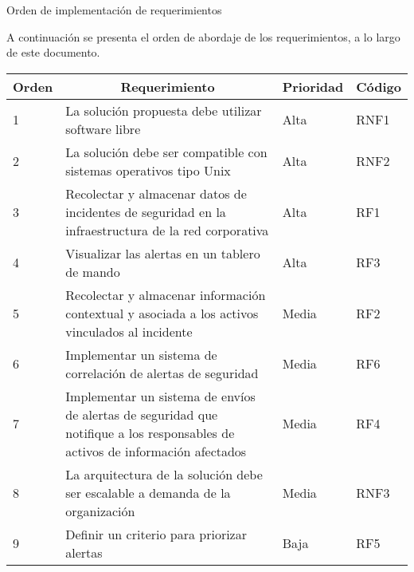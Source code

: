     \begin{section}{Orden de implementación de requerimientos}
    
    A continuación se presenta el orden de abordaje de los requerimientos, a lo largo de este documento.  \par
    
    \begin{table}[h]
    \begin{tabular}{|m{3em}|m{26em}|m{4em}|m{4em}|}
    \hline
    \multicolumn{1}{|l|}{Orden} & \multicolumn{1}{c|}{Requerimiento}                                                                                            & Prioridad & Código\\ \hline
    1     & La solución propuesta debe utilizar software libre                                                                            & Alta   & RNF1   \\ \hline
    2     & La solución debe ser compatible con sistemas operativos tipo Unix                                                             & Alta  & RNF2   \\ \hline
    3     & Recolectar y almacenar datos de incidentes de seguridad en la infraestructura de la red corporativa                           & Alta   & RF1   \\ \hline
    4     & Visualizar las alertas en un tablero de mando                                                                                 & Alta     & RF3 \\ \hline
    5     & Recolectar y almacenar información contextual y asociada a los activos vinculados al incidente                                & Media & RF2    \\ \hline
    6     & Implementar un sistema de correlación de alertas de seguridad                                                                  & Media     & RF6 \\ \hline
    7     & Implementar un sistema de envíos de alertas de seguridad que notifique a los responsables de activos de información afectados & Media & RF4    \\ \hline
    8     & La arquitectura de la solución debe ser escalable a demanda de la organización                                                & Media & RNF3    \\ \hline
    9     & Definir un criterio para priorizar alertas                                                                                    & Baja   & RF5   \\ \hline

\end{tabular}
\end{table}
\end{section}
